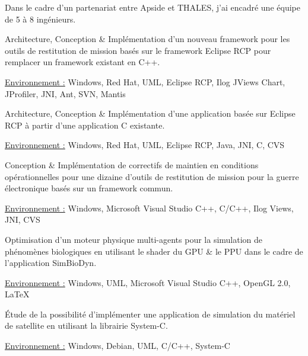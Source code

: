 \documentclass[10pt,letterpaper]{resume/resume}
\begin{document}
\begin{minipage}[t]{\linewidth}
\par Dans le cadre d'un partenariat entre Apside et THALES, j'ai encadr\'e une \'equipe de 5 à 8 ing\'enieurs.
\par Architecture, Conception \& Impl\'ementation d'un nouveau framework pour les outils de restitution de mission bas\'es sur le framework Eclipse RCP pour remplacer un framework existant en C++.
\par\underline{Environnement :} Windows, Red Hat, UML, Eclipse RCP, Ilog JViews Chart, JProfiler, JNI, Ant, SVN, Mantis

\par Architecture, Conception \& Impl\'ementation d'une application bas\'ee sur Eclipse RCP à partir d'une application C existante.
\par\underline{Environnement :} Windows, Red Hat, UML, Eclipse RCP, Java, JNI, C, CVS

\par Conception \& Impl\'ementation de correctifs de maintien en conditions op\'erationnelles pour une dizaine d'outils de restitution de mission pour la guerre \'electronique bas\'es sur un framework commun.
\par\underline{Environnement :} Windows, Microsoft Visual Studio C++, C/C++, Ilog Views, JNI, CVS

\par Optimisation d'un moteur physique multi-agents pour la simulation de ph\'enomènes biologiques en utilisant le shader du GPU \& le PPU dans le cadre de l'application SimBioDyn.
\par\underline{Environnement :} Windows, UML, Microsoft Visual Studio C++, OpenGL 2.0, \LaTeX

\par \'Etude de la possibilit\'e d'impl\'ementer une application de simulation du mat\'eriel de satellite en utilisant la librairie System-C.
\par\underline{Environnement :} Windows, Debian, UML, C/C++, System-C
  \end{minipage}
\end{document}
